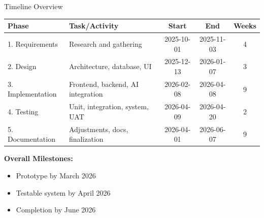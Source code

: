 \begin{frame}{Timeline Overview}
    \begin{table}[]
        \centering
        \small
        \begin{tabular}{|l|p{4.5cm}|c|c|c|}
            \hline
            \textbf{Phase} & \textbf{Task/Activity} & \textbf{Start} & \textbf{End} & \textbf{Weeks} \\
            \hline
            1. Requirements & Research and gathering & 2025-10-01 & 2025-11-03 & 4 \\
            \hline
            2. Design & Architecture, database, UI & 2025-12-13 & 2026-01-07 & 3 \\
            \hline
            3. Implementation & Frontend, backend, AI integration & 2026-02-08 & 2026-04-08 & 9 \\
            \hline
            4. Testing & Unit, integration, system, UAT & 2026-04-09 & 2026-04-20 & 2 \\
            \hline
            5. Documentation & Adjustments, docs, finalization & 2026-04-01 & 2026-06-07 & 9 \\
            \hline
        \end{tabular}
    \end{table}
    
    \vspace{0.3cm}
    \textbf{Overall Milestones:}
    \begin{itemize}
        \item Prototype by March 2026
        \item Testable system by April 2026
        \item Completion by June 2026
    \end{itemize}
\end{frame}

